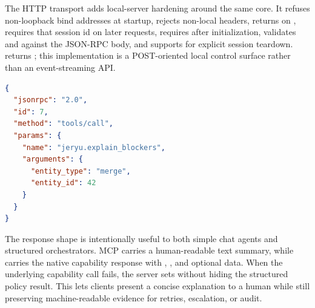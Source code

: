 The HTTP transport adds local-server hardening around the same core. It refuses non-loopback bind addresses at startup, rejects non-local  headers, returns  on , requires that session id on later requests, requires  after initialization, validates  and  against the JSON-RPC body, and supports  for explicit session teardown.  returns ; this implementation is a POST-oriented local control surface rather than an event-streaming API.

\begin{lstlisting}[style=api,language=json,caption={MCP tool call shape}]
{
  "jsonrpc": "2.0",
  "id": 7,
  "method": "tools/call",
  "params": {
    "name": "jeryu.explain_blockers",
    "arguments": {
      "entity_type": "merge",
      "entity_id": 42
    }
  }
}
\end{lstlisting}

The response shape is intentionally useful to both simple chat agents and structured orchestrators. MCP  carries a human-readable text summary, while  carries the native capability response with , , and optional data. When the underlying capability call fails, the server sets  without hiding the structured policy result. This lets clients present a concise explanation to a human while still preserving machine-readable evidence for retries, escalation, or audit.
